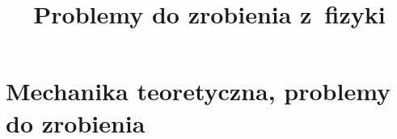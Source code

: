 \documentclass[a4paper,11pt]{article}
\title{Problemy do zrobienia z~fizyki}
\begin{document}





\maketitle  %





\section{Mechanika teoretyczna, problemy do zrobienia}


\end{document}
